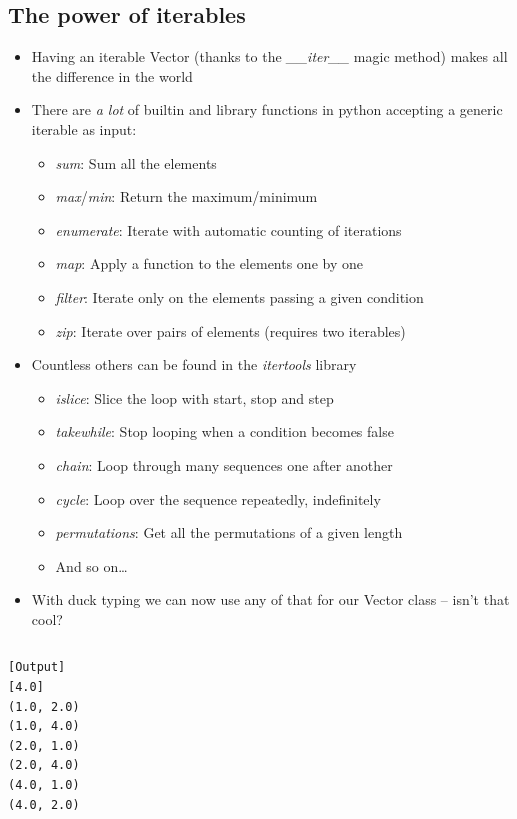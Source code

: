   \subsection{The power of iterables}
  \begin{itemize}
    \item Having an iterable Vector (thanks to the \emph{\_\_iter\_\_} magic
          method) makes all the difference in the world
    \item There are \emph{a lot} of builtin and library functions in python accepting a
          generic iterable as input:
    \begin{itemize}
      \item \emph{sum}: Sum all the elements
      \item \emph{max}/\emph{min}: Return the maximum/minimum
      \item \emph{enumerate}: Iterate with automatic counting of iterations
      \item \emph{map}: Apply a function to the elements one by one
      \item \emph{filter}: Iterate only on the elements passing a given condition
      \item \emph{zip}: Iterate over pairs of elements (requires two iterables)
    \end{itemize}
    \item Countless others can be found in the \alert{\emph{itertools}} library
    \begin{itemize}
      \item \emph{islice}: Slice the loop with start, stop and step
      \item \emph{takewhile}: Stop looping when a condition becomes false
      \item \emph{chain}: Loop through many sequences one after another
      \item \emph{cycle}: Loop over the sequence repeatedly, indefinitely
      \item \emph{permutations}: Get all the permutations of a given length
      \item And so on\dots
    \end{itemize}
    \item With duck typing we can now use any of that for our Vector class -- isn't that cool?
  \end{itemize}

\inputminted{python}{snippets/vector_iterable_test.py}

\begin{verbatim}
[Output]
[4.0]
(1.0, 2.0)
(1.0, 4.0)
(2.0, 1.0)
(2.0, 4.0)
(4.0, 1.0)
(4.0, 2.0)
\end{verbatim} 

